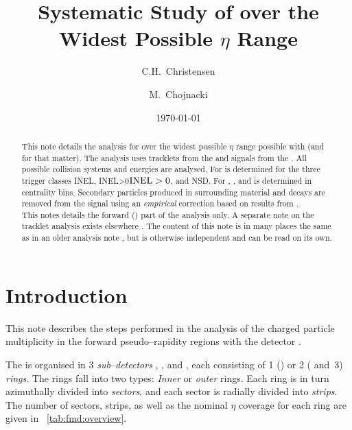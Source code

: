 \documentclass[compat,11pt]{alicenote}
\title{Systematic Study of \ndndeta{} over the Widest Possible $\eta$
  Range}
\institute{1}{Niels Bohr Institute}
\author[C.H.~Christensen \emph{et al}]{%
  C.H.~Christensen\inst[*]{} \and 
  M.~Chojnacki\inst{1}}
\date{\today}
\DeclareRobustCommand{\AlwaysText}[1]{\ifmmode\relax\text{#1}\else #1\fi}
\newcommand*\INEL{\AlwaysText{INEL}}
\newcommand*\NSD{\AlwaysText{NSD}}
\newcommand*\INELGT{\ifmmode\INEL>0\else$\INEL>0$\fi}
\let\INELGt\INELGT
\begin{document}
\maketitle{}
\renewcommand*{\thefootnote}{\arabic{footnote}}
\begin{abstract}
  \noindent
  This note details the analysis for \ndndeta{} over the widest
  possible $\eta$ range possible with \ALICE{} (and \LHC{} for that
  matter).  The analysis uses tracklets from the \SPD{} and signals
  from the \FMD{}.  All possible collision systems and energies are
  analysed.  For \ppCol{} \ndndeta{} is determined for the three
  trigger classes \INEL{}, \INELGt{}, and \NSD{}.  For \PbPbCol{},
  \pPbCol{}, and \PbpCol{} \ndndeta{} is determined in centrality
  bins. Secondary particles produced in surrounding material and
  decays are removed from the \FMD{} signal using an \emph{empirical}
  correction based on results
  from \cite{Abbas:2013bpa}. \\
  
  \noindent
  This notes details the forward (\FMD{}) part of the analysis only.
  A separate note on the \SPD{} tracklet analysis exists elsewhere
  \cite{spdnote}.  The content of this note is in many places the same
  as in an older analysis note \cite{oldnote}, but is otherwise
  independent and can be read on its own.
\end{abstract}

\cleardoublepage
\tableofcontents 

\cleardoublepage

\section{Introduction}

This note describes the steps performed in the analysis of the
charged particle multiplicity in the forward pseudo--rapidity regions
with the \FMD{} detector \cite{FWD:2004mz,cholm:2009}. 

The \FMD{} is organised in 3 \emph{sub--detectors} , ,
and , each consisting of 1 () or 2 ( and~3)
\emph{rings}.  The rings fall into two types: \emph{Inner} or
\emph{outer} rings.  Each ring is in turn azimuthally divided into
\emph{sectors}, and each sector is radially divided into
\emph{strips}.  The number of sectors, strips, as well as the nominal
$\eta$ coverage for each ring are given in
\tablename~\ref{tab:fmd:overview}.
\end{document}
